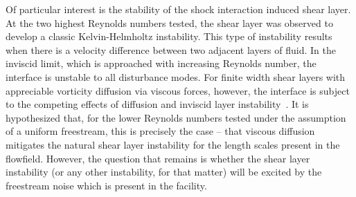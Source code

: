 Of particular interest is the stability of the shock interaction induced shear layer.  At the two highest Reynolds numbers tested, the shear layer was observed to develop a classic Kelvin-Helmholtz instability.  This type of instability results when there is a velocity difference between two adjacent layers of fluid.  In the inviscid limit, which is approached with increasing Reynolds number, the interface is unstable to all disturbance modes.  For finite width shear layers with appreciable vorticity diffusion via viscous forces, however, the interface is subject to the competing effects of diffusion and inviscid layer instability~\cite{viscous_shear_instabilities}.  It is hypothesized that, for the lower Reynolds numbers tested under the assumption of a uniform freestream, this is precisely the case -- that viscous diffusion mitigates the natural shear layer instability for the length scales present in the flowfield.  However, the question that remains is whether the shear layer instability (or any other instability, for that matter) will be excited by the freestream noise which is present in the facility.


